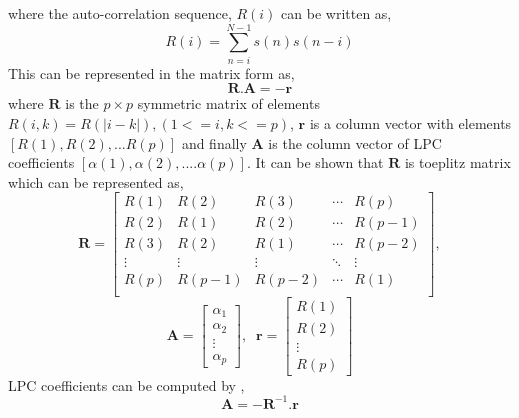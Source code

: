 \documentclass[12pt, a4paper, twoside]{report}
\begin{document}
where the auto-correlation sequence, $R(i)$ can be written as,
\begin{equation}
R(i) = \sum_{n=i}^{N-1}s(n)s(n-i)
\end{equation}
This can be represented in the matrix form as,
\begin{equation}
\mathbf{R}.\mathbf{A} = -\mathbf{r}
\end{equation}
where $\textbf{R}$ is the $p \times p$ symmetric matrix of elements $R(i, k) = R(|i-k|), (1<=i, k<=p)$, $\textbf{r}$ is a column vector with elements $[R(1),R(2),...R(p)]$ and finally $\textbf{A}$ is the column vector of LPC coefficients $[\alpha(1), \alpha(2),....\alpha(p)]$. It can be shown that $\textbf{R}$ is toeplitz matrix which can be represented as,
\begin{equation}
\mathbf{R} = \begin{bmatrix}
R(1) & R(2) & R(3) & \cdots & R(p) \\ 
R(2) & R(1) & R(2) & \cdots & R(p-1) \\ 
R(3) & R(2) & R(1) & \cdots & R(p-2) \\ 
\vdots & \vdots & \vdots & \ddots & \vdots \\ 
R(p) & R(p-1) & R(p-2) & \cdots & R(1) \\ 
\end{bmatrix},
\end{equation}
\begin{equation}
\mathbf{A} = \begin{bmatrix}
\alpha_1 \\ 
\alpha_2 \\ 
\vdots \\ 
\alpha_p
\end{bmatrix}, \;\;
\mathbf{r} = \begin{bmatrix}
R(1) \\ 
R(2) \\ 
\vdots \\ 
R(p)
\end{bmatrix}
\end{equation}
LPC coefficients can be computed by ,
\begin{equation}
\mathbf{A} = -\mathbf{R}^{-1}.\mathbf{r}
\end{equation}
\end{document}
